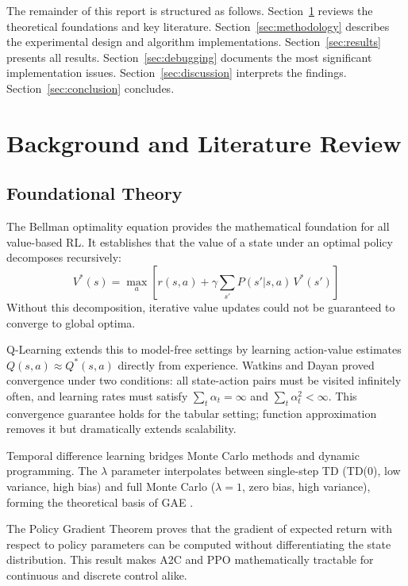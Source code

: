 \documentclass[a4paper,12pt]{article}
\begin{document}
The remainder of this report is structured as follows. Section~\ref{sec:background} reviews the theoretical foundations and key literature. Section~\ref{sec:methodology} describes the experimental design and algorithm implementations. Section~\ref{sec:results} presents all results. Section~\ref{sec:debugging} documents the most significant implementation issues. Section~\ref{sec:discussion} interprets the findings. Section~\ref{sec:conclusion} concludes.

\section{Background and Literature Review}
\label{sec:background}

\subsection{Foundational Theory}

The Bellman optimality equation \cite{bellman1957dynamic} provides the mathematical foundation for all value-based RL. It establishes that the value of a state under an optimal policy decomposes recursively:
\begin{equation}
  V^*(s) = \max_a \left[ r(s,a) + \gamma \sum_{s'} P(s'|s,a)\, V^*(s') \right]
\end{equation}
Without this decomposition, iterative value updates could not be guaranteed to converge to global optima.

Q-Learning \cite{watkins1992q} extends this to model-free settings by learning action-value estimates $Q(s,a) \approx Q^*(s,a)$ directly from experience. Watkins and Dayan proved convergence under two conditions: all state-action pairs must be visited infinitely often, and learning rates must satisfy $\sum_t \alpha_t = \infty$ and $\sum_t \alpha_t^2 < \infty$. This convergence guarantee holds for the tabular setting; function approximation removes it but dramatically extends scalability.

Temporal difference learning \cite{sutton1988learning} bridges Monte Carlo methods and dynamic programming. The $\lambda$ parameter interpolates between single-step TD (TD(0), low variance, high bias) and full Monte Carlo ($\lambda=1$, zero bias, high variance), forming the theoretical basis of GAE \cite{schulman2015high}.

The Policy Gradient Theorem \cite{sutton2018reinforcement} proves that the gradient of expected return with respect to policy parameters can be computed without differentiating the state distribution. This result makes A2C and PPO mathematically tractable for continuous and discrete control alike.
\end{document}
